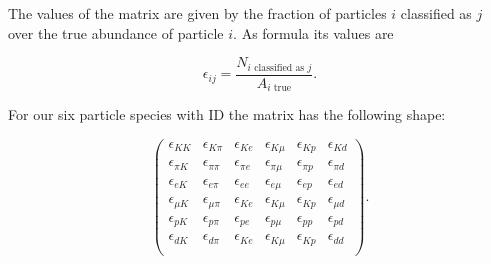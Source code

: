 The values of the matrix are given by the fraction of particles $i$ classified as $j$ over the true abundance of particle $i$. As formula its values are

\begin{equation}
    \epsilon_{i j} = \frac{N_{i \text{ classified as } j}}{A_{i \text{ true}}}.
\end{equation}

For our six particle species with ID the matrix has the following shape:

\begin{equation}
    \begin{pmatrix}
        \epsilon_{K K} & \epsilon_{K \pi} & \epsilon_{K e} & \epsilon_{K \mu} & \epsilon_{K p} & \epsilon_{K d} \\
        \epsilon_{\pi K} & \epsilon_{\pi \pi} & \epsilon_{\pi e} & \epsilon_{\pi \mu} & \epsilon_{\pi p} & \epsilon_{\pi d} \\
        \epsilon_{e K} & \epsilon_{e \pi} & \epsilon_{e e} & \epsilon_{e \mu} & \epsilon_{e p} & \epsilon_{e d} \\
        \epsilon_{\mu K} & \epsilon_{\mu \pi} & \epsilon_{K e} & \epsilon_{K \mu} & \epsilon_{K p} & \epsilon_{\mu d} \\
        \epsilon_{p K} & \epsilon_{p \pi} & \epsilon_{p e} & \epsilon_{p \mu} & \epsilon_{p p} & \epsilon_{p d} \\
        \epsilon_{d K} & \epsilon_{d \pi} & \epsilon_{K e} & \epsilon_{K \mu} & \epsilon_{K p} & \epsilon_{d d} \\
    \end{pmatrix}.
\end{equation}
